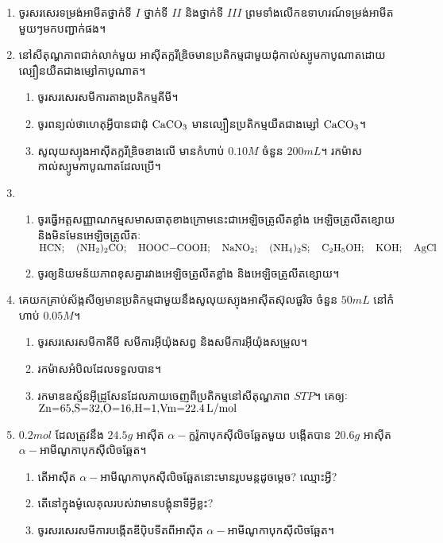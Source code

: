 \documentclass{officialexam}
\begin{document}
\begin{enumerate}[I]
	\item ចូរសរសេរទម្រង់អាមីតថ្នាក់ទី $I$ ថ្នាក់ទី $II$ និងថ្នាក់ទី $III$ ព្រមទាំងលើកឧទាហរណ៍ទម្រង់អាមីតមួយៗមកបញ្ជាក់ផង។
	\item នៅសីតុណ្ហភាពជាក់លាក់មួយ អាសុីតក្លរីឌ្រិចមានប្រតិកម្មជាមួយដុំកាល់ស្យូមកាបូណាតដោយល្បឿនយឺតជាងម្សៅកាបូណាត។
	\begin{enumerate}[k]
		\item ចូរសរសេរសមីការតាងប្រតិកម្មគីមី។
		\item ចូរពន្យល់ថាហេតុអ្វីបានជាដុំ $\ce{CaCO3}$ មានល្បឿនប្រតិកម្មយឺតជាងម្សៅ $\ce{CaCO3}$។
		\item សូលុយស្យុងអាសុីតក្លរីឌ្រិចខាងលើ មានកំហាប់ $0.10M$ ចំនួន $200mL$។ រកម៉ាសកាល់ស្យូមកាបូណាតដែលប្រើ។
	\end{enumerate}
	\item \begin{enumerate}[m]
		\item ចូរធ្វើអត្តសញ្ញាណកម្មសមាសធាតុខាងក្រោមនេះជាអេឡិចត្រូលីតខ្លាំង អេឡិចត្រូលីតខ្សោយ និងមិនមែនអេឡិចត្រូលីតៈ\\
		$\ce{HCN};\quad\ce{(NH2)2CO};\quad \ce{HOOC-COOH};\quad \ce{NaNO2};\quad \ce{(NH4)2S};\quad \ce{C2H5OH};\quad \ce{KOH};\quad \ce{AgCl}$
		\item ចូរឲ្យនិយមន័យភាពខុសគ្នារវាងអេឡិចត្រូលីតខ្លាំង និងអេឡិចត្រូលីតខ្សោយ។
	\end{enumerate}
	\item គេយកគ្រាប់ស័ង្កសីឲ្យមានប្រតិកម្មជាមួយនឹងសូលុយស្យុងអាសុីតស៊ុលផួរិច ចំនួន $50mL$ នៅកំហាប់ $0.05M$។
	\begin{enumerate}[k]
		\item ចូរសរសេរសមីកាគីមី សមីការអុីយ៉ុងសព្វ និងសមីការអុីយ៉ុងសម្រួល។
		\item រកម៉ាសអំបិលដែលទទួលបាន។
		\item រកមាឌឧស្ម័នអុីដ្រូសែនដែលភាយចេញពីប្រតិកម្មនៅសីតុណ្ហភាព $STP$។
		គេឲ្យៈ $\ce{Zn=65, S=32, O=16, H=1, Vm=22.4L/mol}$
	\end{enumerate}
	\item $0.2mol$ ដែលត្រូវនឹង $24.5g$ អាសុីត $\alpha -$ក្លរ៉ូកាបុកសុីលិចឆ្អែតមួយ បង្កើតបាន $20.6g$ អាសុីត $\alpha -$អាមីណូកាបុកសុីលិចឆ្អែត។
	\begin{enumerate}[k]
		\item តើអាសុីត $\alpha -$អាមីណូកាបុកសុីលិចឆ្អែតនោះមានរូបមន្តដូចម្តេច? ឈ្មោះអ្វី?
		\item តើនៅក្នុងម៉ូលេគុលរបស់វាមានបង្គុំនាទីអ្វីខ្លះ?
		\item ចូរសរសេរសមីការបង្កើតឌីបុិបទីតពីអាសុីត $\alpha -$អាមីណូកាបុកសុីលិចឆ្អែត។

\end{enumerate}
\end{enumerate}
\end{document}

